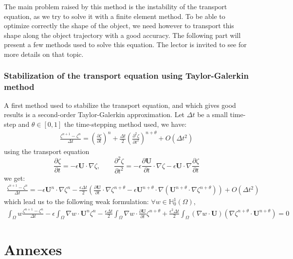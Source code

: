 \documentclass[11pt,a4paper]{article}
\begin{document}
				The main problem raised by this method is the instability of the transport equation, as we try to solve it with a finite element method. To be able to optimize correctly the shape of the object, we need however to transport this shape along the object trajectory with a good accuracy. The following part will present a few methods used to solve this equation. The lector is invited to see \cite{Transport} for more details on that topic.
				
					\subsubsection{Stabilization of the transport equation using Taylor-Galerkin method}
					A first method used to stabilize the transport equation, and which gives good results is a second-order Taylor-Galerkin approximation.
					Let $\Delta t$ be a small time-step and $\theta \in [0,1]$ the time-stepping method used, we have:	
					\begin{align}
						\displaystyle \frac{\zeta^{n+1} - \zeta^n}{\Delta t} = \left(\frac{\partial \zeta}{\partial t} \right)^n + \frac{\Delta t}{2} \left(\frac{\partial^2 \zeta}{\partial t^2} \right)^{n+\theta} + O(\Delta t^2)
					\end{align}
					using the transport equation
					\begin{equation}
						\displaystyle \frac{\partial \zeta}{\partial t} = - \epsilon \mathbf{U} \cdot \nabla \zeta, \qquad \displaystyle \frac{\partial^2 \zeta}{\partial t^2} = - \epsilon \frac{\partial \mathbf{U}}{\partial t} \cdot \nabla \zeta - \epsilon \mathbf{U} \cdot \nabla \frac{\partial \zeta}{\partial t}
					\end{equation}
					we get:
					\begin{align}
						\displaystyle \frac{\zeta^{n+1} - \zeta^n}{\Delta t} =- \epsilon \mathbf{U}^n \cdot \nabla \zeta^n - \frac{\epsilon \Delta t}{2} \left(\frac{\partial \mathbf{U}}{\partial t} \cdot \nabla \zeta^{n+\theta} - \epsilon \mathbf{U}^{n+\theta} \cdot \nabla (\mathbf{U}^{n+\theta} \cdot \nabla \zeta^{n+\theta})\right) + O(\Delta t^2)
					\end{align}
					which lead us to the following weak formulation: $\forall w \in \mathbb{H}^1_0(\Omega)$,
					\begin{align}
						\displaystyle \int_{\Omega}{\! w \frac{\zeta^{n+1} - \zeta^n}{\Delta t}}  -   \epsilon \int_{\Omega}{\! \nabla w \cdot  \mathbf{U}^n  \zeta^n} - \frac{\epsilon \Delta t}{2} \int_{\Omega}{\! \nabla w \cdot \frac{\partial \mathbf{U}}{\partial t} \zeta^{n+\theta}}
						 +  \frac{\epsilon^2 \Delta t}{2} \int_{\Omega}{\! (\nabla w \cdot \mathbf{U})(\nabla \zeta^{n+\theta} \cdot \mathbf{U}^{n+\theta})} = 0
					\end{align}
					
					
					
		
	
		\pagebreak	
	
	\section*{Annexes}
		
		\pagebreak
		
		 
		
		
		\appendix
\end{document}
